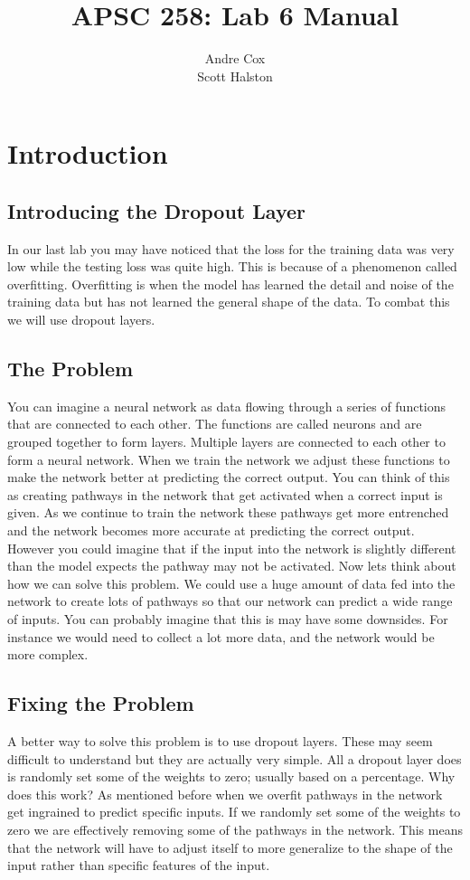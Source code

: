 \documentclass[11pt]{report}
\title{APSC 258: Lab 6 Manual}
\author{Andre Cox  \\ Scott Halston}
\begin{document}
\maketitle
\tableofcontents

\clearpage

\chapter{Introduction}
\section{Introducing the Dropout Layer}
In our last lab you may have noticed that the loss for the training data was very low while the testing loss was quite high. This is because of a phenomenon called overfitting. Overfitting is when the model has learned the detail and noise of the training data but has not learned the general shape of the data. To combat this we will use dropout layers. 

\section{The Problem}
You can imagine a neural network as data flowing through a series of functions that are connected to each other. The functions are called neurons and are grouped together to form layers. Multiple layers are connected to each other to form a neural network. When we train the network we adjust these functions to make the network better at predicting the correct output. You can think of this as creating pathways in the network that get activated when a correct input is given. As we continue to train the network these pathways get more entrenched and the network becomes more accurate at predicting the correct output. However you could imagine that if the input into the network is slightly different than the model expects the pathway may not be activated. Now lets think about how we can solve this problem. We could use a huge amount of data fed into the network to create lots of pathways so that our network can predict a wide range of inputs. You can probably imagine that this is may have some downsides. For instance we would need to collect a lot more data, and the network would be more complex. 

\section{Fixing the Problem}
A better way to solve this problem is to use dropout layers. These may seem difficult to understand but they are actually very simple. All a dropout layer does is randomly set some of the weights to zero; usually based on a percentage. Why does this work? As mentioned before when we overfit pathways in the network get ingrained to predict specific inputs. If we randomly set some of the weights to zero we are effectively removing some of the pathways in the network. This means that the network will have to adjust itself to more generalize to the shape of the input rather than specific features of the input.
\end{document}
